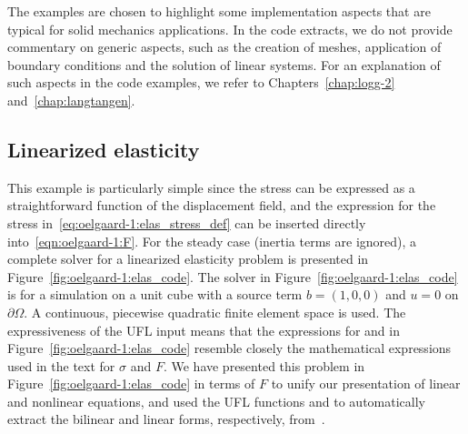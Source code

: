 The examples are chosen to highlight some implementation aspects that are
typical for solid mechanics applications. In the code extracts,
we do not provide commentary on generic aspects, such as the creation of
meshes, application of boundary conditions and the solution of linear
systems.  For an explanation of such aspects in the code examples,
we refer to Chapters~\ref{chap:logg-2} and~\ref{chap:langtangen}.

\subsection{Linearized elasticity}

This example is particularly simple since the stress can be expressed as
a straightforward function of the displacement field, and the expression
for the stress in~\eqref{eq:oelgaard-1:elas_stress_def} can be inserted
directly into~\eqref{eqn:oelgaard-1:F}.  For the steady case (inertia
terms are ignored), a complete solver for a linearized elasticity
problem is presented in Figure~\ref{fig:oelgaard-1:elas_code}.
The solver in Figure~\ref{fig:oelgaard-1:elas_code} is for a
simulation on a unit cube with a source term $b = (1, 0, 0)$ and
$u = 0$ on $\partial \Omega$.  A continuous, piecewise quadratic
finite element space is used.  The expressiveness of the UFL input
means that the expressions for  and  in
Figure~\ref{fig:oelgaard-1:elas_code} resemble closely the mathematical
expressions used in the text for $\sigma$ and $F$. We have presented
this problem in Figure~\ref{fig:oelgaard-1:elas_code} in terms of $F$
to unify our presentation of linear and nonlinear equations, and used
the UFL functions  and  to automatically extract the
bilinear and linear forms, respectively, from~.

